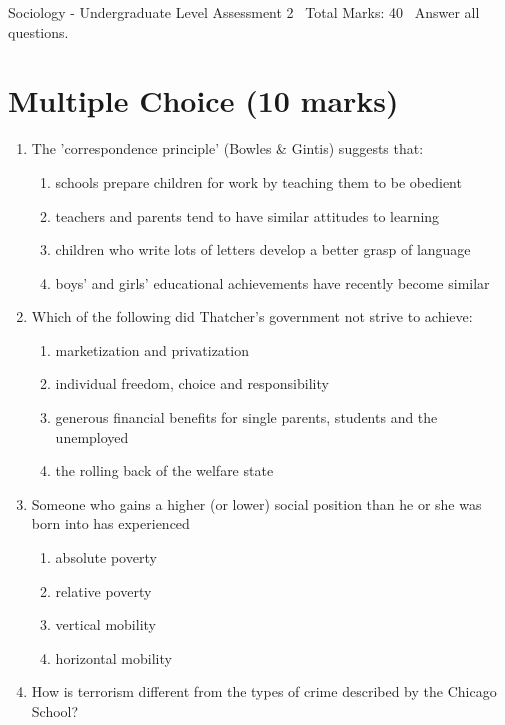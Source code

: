 \documentclass[12pt]{article}
\begin{document}
\begin{center}
Sociology - Undergraduate Level Assessment 2 \
Total Marks: 40 \
Answer all questions.
\end{center}

\section*{Multiple Choice (10 marks)}
\begin{enumerate}[label=\arabic*.]
\item The 'correspondence principle' (Bowles \& Gintis) suggests that:
\begin{enumerate}[label=(\alph*)]
    \item schools prepare children for work by teaching them to be obedient
    \item teachers and parents tend to have similar attitudes to learning
    \item children who write lots of letters develop a better grasp of language
    \item boys' and girls' educational achievements have recently become similar
\end{enumerate}
\item Which of the following did Thatcher's government not strive to achieve:
\begin{enumerate}[label=(\alph*)]
    \item marketization and privatization
    \item individual freedom, choice and responsibility
    \item generous financial benefits for single parents, students and the unemployed
    \item the rolling back of the welfare state
\end{enumerate}
\item Someone who gains a higher (or lower) social position than he or she was born into has experienced
\begin{enumerate}[label=(\alph*)]
    \item absolute poverty
    \item relative poverty
    \item vertical mobility
    \item horizontal mobility
\end{enumerate}
\item How is terrorism different from the types of crime described by the Chicago School?
\begin{enumerate}[label=(\alph*)]

\end{enumerate}
\end{enumerate}
\end{document}
